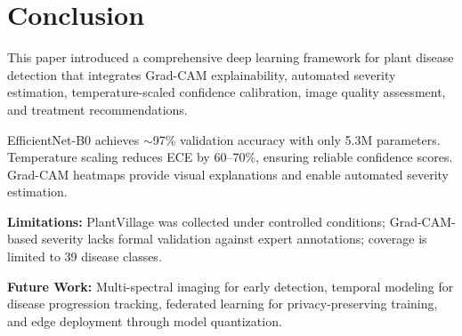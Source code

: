 \documentclass[conference]{IEEEtran}
\begin{document}
\section{Conclusion}

This paper introduced a comprehensive deep learning framework for plant disease detection that integrates Grad-CAM explainability, automated severity estimation, temperature-scaled confidence calibration, image quality assessment, and treatment recommendations.

EfficientNet-B0 achieves $\sim$97\% validation accuracy with only 5.3M parameters. Temperature scaling reduces ECE by 60--70\%, ensuring reliable confidence scores. Grad-CAM heatmaps provide visual explanations and enable automated severity estimation.

\textbf{Limitations:} PlantVillage was collected under controlled conditions; Grad-CAM-based severity lacks formal validation against expert annotations; coverage is limited to 39 disease classes.

\textbf{Future Work:} Multi-spectral imaging for early detection, temporal modeling for disease progression tracking, federated learning for privacy-preserving training, and edge deployment through model quantization.

\end{document}
